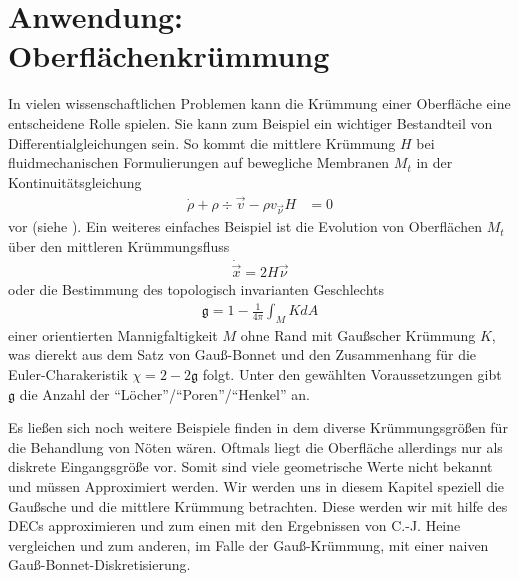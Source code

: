\chapter{Anwendung: Oberflächenkrümmung}
  
  \begin{ziel}
    In vielen wissenschaftlichen Problemen kann die Krümmung
    einer Oberfläche eine entscheidene Rolle spielen. 
    Sie kann zum Beispiel ein wichtiger Bestandteil von Differentialgleichungen sein.
    So kommt die mittlere Krümmung \( H \) bei fluidmechanischen Formulierungen auf bewegliche Membranen 
    \( M_{t} \) in der
    Kontinuitätsgleichung
    \begin{align}
      \dot{\rho} + \rho\div\vec{v} - \rho v_{\vec{\nu}} H &= 0
    \end{align}
    vor (siehe \cite{desimone}).
    Ein weiteres einfaches Beispiel ist die Evolution von Oberflächen \( M_{t} \) über den mittleren
    Krümmungsfluss
    \begin{align}
      \dot{\vec{x}} = 2 H \vec{\nu} 
    \end{align}
    oder die Bestimmung des topologisch invarianten Geschlechts
    \begin{align}
      \mathfrak{g} = 1 - \frac{1}{4\pi}\int_{M}KdA
    \end{align}
    einer orientierten Mannigfaltigkeit \( M \) ohne Rand mit Gaußscher Krümmung \( K \),
    was dierekt aus dem Satz von Gauß-Bonnet 
    und den Zusammenhang für die Euler-Charakeristik \( \chi = 2-2\mathfrak{g} \) folgt.
    Unter den gewählten Voraussetzungen gibt \( \mathfrak{g} \) die Anzahl der "`Löcher"'/"`Poren"'/"`Henkel"' an.
    
    Es ließen sich noch weitere Beispiele finden in dem diverse Krümmungsgrößen für die Behandlung von
    Nöten wären.
    Oftmals liegt die Oberfläche allerdings nur als diskrete Eingangsgröße vor. 
    Somit sind viele
    geometrische Werte nicht bekannt und müssen Approximiert werden.
    Wir werden uns in diesem Kapitel speziell die Gaußsche und die mittlere Krümmung betrachten.
    Diese werden wir mit hilfe des DECs approximieren und zum einen mit den Ergebnissen von C.-J. Heine 
    \cite{heine} vergleichen und zum anderen, im Falle der Gauß-Krümmung, mit einer naiven 
    Gauß-Bonnet-Diskretisierung.
  \end{ziel}

